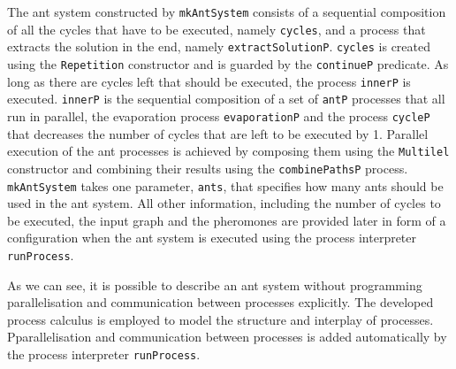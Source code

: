 The ant system constructed by \texttt{mkAntSystem} consists of a sequential composition of all the cycles that have to be executed, namely \texttt{cycles}, and a process that extracts the solution in the end, namely \texttt{extractSolutionP}. \texttt{cycles} is created using the \texttt{Repetition} constructor and is guarded by the \texttt{continueP} predicate. As long as there are cycles left that should be executed, the process \texttt{innerP} is executed. \texttt{innerP} is the sequential composition of a set of \texttt{antP} processes that all run in parallel, the evaporation process \texttt{evaporationP} and the process \texttt{cycleP} that decreases the number of cycles that are left to be executed by 1. Parallel execution of the ant processes is achieved by composing them using the \texttt{Multilel} constructor and combining their results using the \texttt{combinePathsP} process. \texttt{mkAntSystem} takes one parameter, \texttt{ants}, that specifies how many ants should be used in the ant system. All other information, including the number of cycles to be executed, the input graph and the pheromones are provided later in form of a configuration when the ant system is executed using the process interpreter \texttt{runProcess}.

As we can see, it is possible to describe an ant system without programming parallelisation and communication between processes explicitly. The developed process calculus is employed to model the structure and interplay of processes. Pparallelisation and communication between processes is added automatically by the process interpreter \texttt{runProcess}.